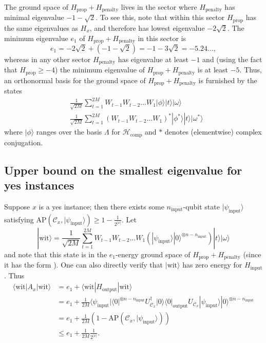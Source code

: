 \documentclass[../thesis-main/thesis-main]{subfiles}
\begin{document}
The ground space of $H_{\text{prop}}+H_{\text{penalty}}$ lives in the sector where $H_{\text{penalty}}$ has minimal eigenvalue $-1-\sqrt{2}$. To see this, note that within this sector $H_{\text{prop}}$ has the same eigenvalues as $H_{x}$, and therefore has lowest eigenvalue $-2\sqrt{2}$. The minimum eigenvalue $e_{1}$ of $H_{\text{prop}}+H_{\text{penalty}}$ in this sector is 
\begin{equation}
e_{1}=-2\sqrt{2}+\left(-1-\sqrt{2}\right)=-1-3\sqrt{2}=-5.24\ldots,\label{eq:e_1_definition-1}
\end{equation}
whereas in any other sector $H_{\text{penalty}}$ has eigenvalue at least $-1$ and (using the fact that $H_{\text{prop}}\geq-4$) the minimum eigenvalue of $H_{\text{prop}}+H_{\text{penalty}}$ is at least $-5.$ Thus, an orthonormal basis for the ground space of $H_{\text{prop}}+H_{\mathrm{penalty}}$ is furnished by the states 
\begin{align}
 & \frac{1}{\sqrt{2M}}\sum_{t=1}^{2M}W_{t-1}W_{t-2}\ldots W_{1}|\phi\rangle|t\rangle|\omega\rangle\label{eq:gs_Hprop_Hpen1}\\
 & \frac{1}{\sqrt{2M}}\sum_{t=1}^{2M}(W_{t-1}W_{t-2}\ldots W_{1})^{*}|\phi^{*}\rangle|t\rangle|\omega^{*}\rangle\label{eq:gs_Hprop_Hpen2}
\end{align}
where $|\phi\rangle$ ranges over the basis $\Lambda$ for $\mathcal{H}_{\text{comp}}$ and $*$ denotes (elementwise) complex conjugation. 

\subsection{Upper bound on the smallest eigenvalue for yes instances}
\label{sec:mappingyes}

Suppose $x$ is a yes instance; then there exists some $n_{\text{input}}$-qubit state $|\psi_{\text{input}}\rangle$ satisfying $\text{AP}\left(\mathcal{C}_{x},|\psi_{\text{input}}\rangle\right)\geq1-\frac{1}{2^{|x|}}$. Let
\[
|\text{wit}\rangle=\frac{1}{\sqrt{2M}}\sum_{t=1}^{2M}W_{t-1}W_{t-2}\ldots W_{1}\left(|\psi_{\text{input}}\rangle|0\rangle^{\otimes n-n_{\text{input}}}\right)|t\rangle|\omega\rangle
\]
and note that this state is in the $e_{1}$-energy ground space of
$H_{\text{prop}}+H_{\text{penalty}}$ (since it has the form ).
One can also directly verify that $|\text{wit}\rangle$ has zero energy for $H_{\text{input}}$. Thus
\begin{align*}
\langle\text{wit}|A_{x}|\text{wit}\rangle & =e_{1}+\langle\text{wit}|H_{\text{output}}|\text{wit}\rangle\\
 & =e_{1}+\frac{1}{2M}\langle\psi_{\text{input}}|\langle0|^{\otimes n-n_{\text{input}}}U_{\mathcal{C}_{x}}^{\dagger}|0\rangle\langle0|_{\text{output}}U_{\mathcal{C}_{x}}|\psi_{\text{input}}\rangle|0\rangle^{\otimes n-n_{\text{input}}}\\
 & =e_{1}+\frac{1}{2M}\left(1-\text{AP}(\mathcal{C}_{x},|\psi_{\text{input}}\rangle)\right)\\
 & \leq e_{1}+\frac{1}{2M}\frac{1}{2^{|x|}}.
\end{align*}
\end{document}
